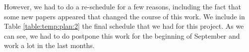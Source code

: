 However, we had to do a re-schedule for a few reasons, including the fact that some new papers appeared that changed the course of this work. We include in Table \ref{table:temp:plan:2} the final schedule that we had for this project. As we can see, we had to do postpone this work for the beginning of September and work a lot in the last months.



\begin{table}[H]
    \centering
\end{table}

